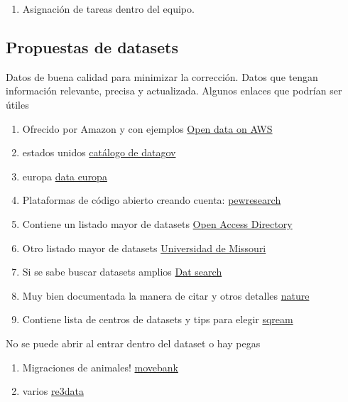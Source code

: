\documentclass{article}
\begin{document}
\begin{enumerate}
    \item Asignación de tareas dentro del equipo.
\end{enumerate}
\subsection*{Propuestas de datasets}
Datos de buena calidad para minimizar la corrección.
Datos que tengan información relevante, precisa y actualizada.
Algunos enlaces que podrían ser útiles
\begin{enumerate}
    \item Ofrecido por Amazon y con ejemplos \href{https://registry.opendata.aws/}{Open data on AWS}
    \item estados unidos \href{https://catalog.data.gov/dataset?q=&sort=views_recent+desc}{catálogo de datagov}
    \item europa \href{https://data.europa.eu/data/datasets?locale=en}{data europa}
    \item Plataformas de código abierto creando cuenta: \href{https://www.pewresearch.org/datasets/}{pewresearch}
    \item Contiene un listado mayor de datasets \href{https://oad.simmons.edu/oadwiki/Data_repositories}{Open Access Directory}
    \item Otro listado mayor de datasets \href{https://libraryguides.missouri.edu/datasets/public-use}{Universidad de Missouri}
    \item Si se sabe buscar datasets amplios \href{https://datasetsearch.research.google.com/}{Dat search}
    \item Muy bien documentada la manera de citar y otros detalles \href{https://www.nature.com/sdata/policies/repositories}{nature}
    \item Contiene lista de centros de datasets y tips para elegir \href{https://sqream.com/blog/big-datasets-for-analysis/#:~:text=We%E2%80%99ll%20guide%20you%20through%20key%20factors%20to%20consider%2C,would%20be%20impossible%20to%20detect%20in%20smaller%20datasets.}{sqream}
    
\end{enumerate}
No se puede abrir al entrar dentro del dataset o hay pegas
\begin{enumerate}
    \item Migraciones de animales! \href{https://www.movebank.org/cms/webapp?gwt_fragment=page=search_map}{movebank}
    \item varios \href{https://www.re3data.org/}{re3data}
\end{enumerate}
\end{document}
